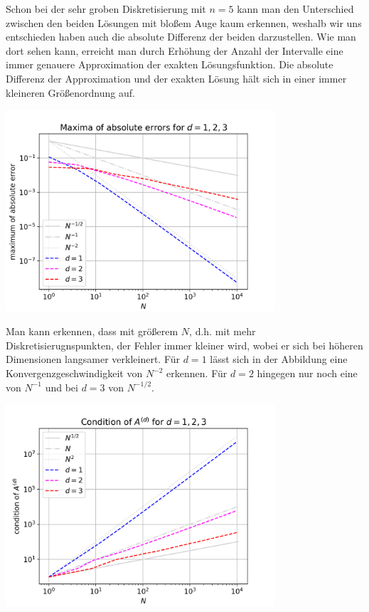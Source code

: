 \documentclass{scrartcl}
\begin{document}
Schon bei der sehr groben Diskretisierung mit $n=5$ kann man den Unterschied zwischen den beiden Lösungen mit bloßem Auge kaum erkennen, weshalb wir uns entschieden haben auch die absolute Differenz der beiden darzustellen.
Wie man dort sehen kann, erreicht man durch Erhöhung der Anzahl der Intervalle eine immer genauere Approximation der exakten Lösungsfunktion. Die absolute Differenz der Approximation und der exakten Lösung hält sich in einer immer kleineren Größenordnung auf.

{
  \centering
    \includegraphics[width=0.75\textwidth]{Grafiken/loglogerr_d123_neu}
    \vspace{-0.2cm}
}
\vspace{0.5cm}

Man kann erkennen, dass mit größerem $N$, d.h. mit mehr Diskretisierugnspunkten, der Fehler immer kleiner wird, wobei er sich bei höheren Dimensionen langsamer verkleinert.
Für $d=1$ lässt sich in der Abbildung eine Konvergenzgeschwindigkeit von $N^{-2}$ erkennen. Für $d=2$ hingegen nur noch eine von $N^{-1}$ und bei $d=3$ von $N^{-1/2}$.

{
  \centering
    \includegraphics[width=0.75\textwidth]{Grafiken/loglogcond_d123_neu}
    \vspace{-0.2cm}
}
\vspace{0.5cm}
\end{document}
